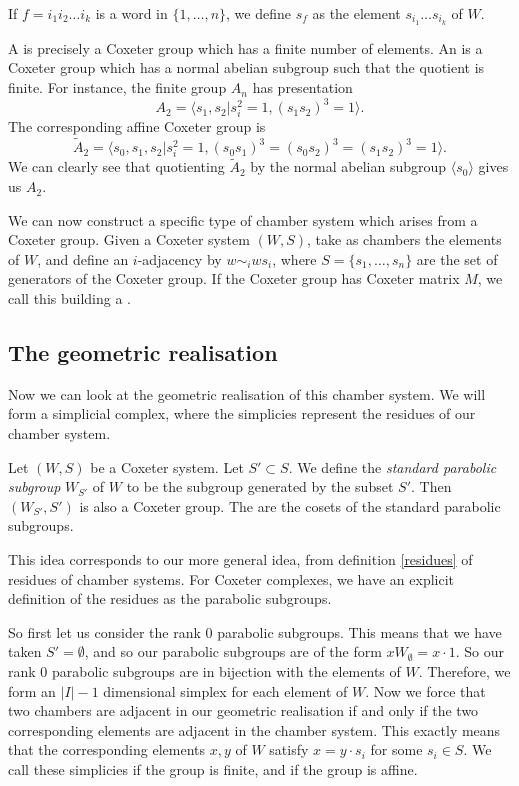 \documentclass[11pt]{article}
\begin{document}
\begin{definition}
    If $f=i_1i_2\hdots  i_k$ is a word in $\{1,\hdots ,n\}$, we define $s_f$ as the element $s_{i_1}\hdots  s_{i_k}$ of $W$.
\end{definition}

A  is precisely a Coxeter group which has a finite number of elements. An  is a Coxeter group which has a normal abelian subgroup such that the quotient is finite. For instance, the finite group $A_n$ has presentation
\[A_2=\langle s_1,s_2|s_i^2=1, (s_1s_2)^3=1\rangle.\]
The corresponding affine Coxeter group is
\[\tilde{A}_2=\langle s_0,s_1,s_2|s_i^2=1, (s_0s_1)^3=(s_0s_2)^3=(s_1s_2)^3=1\rangle.\]
We can clearly see that quotienting $\tilde{A}_2$ by the normal abelian subgroup $\langle s_0\rangle$ gives us $A_2$. 


We can now construct a specific type of chamber system which arises from a Coxeter group. Given a Coxeter system $(W,S)$, take as chambers the elements of $W$, and define an $i$-adjacency by $w\sim_iws_i$, where $S=\{s_1,\hdots  ,s_n\}$ are the set of generators of the Coxeter group. If the Coxeter group has Coxeter matrix $M$, we call this building a .


\subsection{The geometric realisation}
Now we can look at the geometric realisation of this chamber system. We will form a simplicial complex, where the simplicies represent the residues of our chamber system. 



\begin{definition}
    Let $(W,S)$ be a Coxeter system. Let $S'\subset S$. We define the \textit{standard parabolic subgroup} $W_{S'}$ of $W$ to be the subgroup generated by the subset $S'$. Then $(W_{S'},S')$ is also a Coxeter group. The  are the cosets of the standard parabolic subgroups. 
\end{definition}

This idea corresponds to our more general idea, from definition \ref{residues} of residues of chamber systems. For Coxeter complexes, we have an explicit definition of the residues as the parabolic subgroups. 

So first let us consider the rank 0 parabolic subgroups. This means that we have taken $S'=\emptyset$, and so our parabolic subgroups are of the form $xW_\emptyset=x\cdot{1}$. So our rank 0 parabolic subgroups are in bijection with the elements of $W$. Therefore, we form an $|I|-1$ dimensional simplex for each element of $W$. Now we force that two chambers are adjacent in our geometric realisation if and only if the two corresponding elements are adjacent in the chamber system. This exactly means that the corresponding elements $x,y$ of $W$ satisfy $x=y\cdot s_i$ for some $s_i\in S$. We call these simplicies  if the group is finite, and  if the group is affine.
\end{document}
